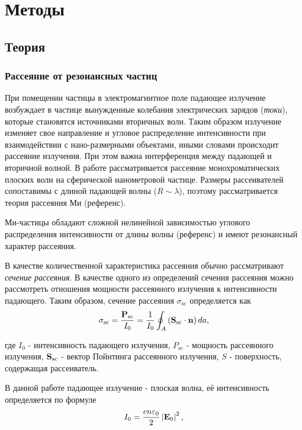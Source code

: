 \chapter{Методы}


\section{Теория}\label{sec:theory}

\subsection{Рассеяние от резонансных частиц}\label{subsec:scat_cs}
При помещении частицы в электромагнитное поле падающее излучение возбуждает в частице вынужденные колебания электрических зарядов (\textit{токи}), которые становятся источниками вторичных волн. Таким образом излучение изменяет свое направление и угловое распределение интенсивности при взаимодействии с нано-размерными объектами, иными словами происходит рассеяние излучения. При этом важна интерференция между падающей и вторичной волной. В работе рассматривается рассеяние монохроматических плоских волн на сферической нанометровой частице. Размеры рассеивателей сопоставимы с длиной падающей волны ($R \sim \lambda$), поэтому рассматривается теория рассеяния Ми (референс). 

Ми-частицы обладают сложной нелинейной зависимостью углового распределения интенсивности от длины волны (референс) и имеют резонансный характер рассеяния.

В качестве количественной характеристика рассеяния обычно рассматривают \textit{сечение рассеяния}. В качестве одного из определений сечения рассеяния можно рассмотреть отношения мощности рассеянного излучения к интенсивности падающего. Таким образом, сечение рассеяния $\sigma_{\text{sc}}$ определяется как
\begin{equation}
    \sigma_{\text{sc}} = \frac{\vb{P_{\text{sc}}}}{I_0} = \frac{1}{I_0} \oint_A  \left(  \mathbf{S}_{\text{sc}} \cdot \vb{n} \right) da,
\end{equation}

где $I_0$ - интенсивность падающего излучения, $P_{\text{sc}}$ - мощность рассеянного излучения, $\vb{S}_{\text{sc}}$ - вектор Пойнтинга рассеянного излучения, $S$ - поверхность, содержащая рассеиватель.

В данной работе падающее излучение - плоская волна, её интенсивность определяется по формуле
\begin{equation}
    I_0 = \frac{c n \varepsilon_0}{2} \left| \vb{E}_0 \right|^2,
\end{equation}

